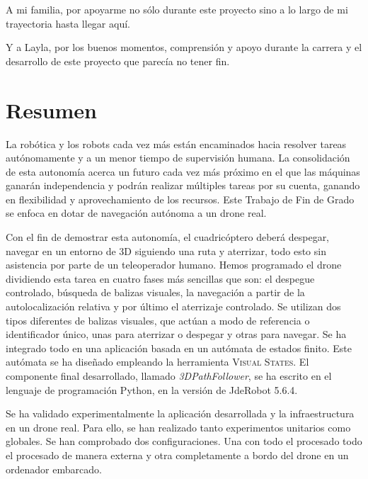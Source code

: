 \documentclass[a4paper, 12pt, oneside]{book}
\begin{document}
A mi familia, por apoyarme no sólo durante este proyecto sino a lo largo de mi trayectoria hasta llegar aquí.

Y a Layla, por los buenos momentos, comprensión y apoyo durante la carrera y el desarrollo de este proyecto que parecía no tener fin.

\chapter*{Resumen}
La robótica y los robots cada vez más están encaminados hacia resolver tareas autónomamente y a un menor tiempo de supervisión humana. La consolidación de esta autonomía acerca un futuro cada vez más próximo en el que las máquinas ganarán independencia y podrán realizar múltiples tareas por su cuenta, ganando en flexibilidad y aprovechamiento de los recursos. Este Trabajo de Fin de Grado se enfoca en dotar de navegación autónoma a un drone real.
 
Con el fin de demostrar esta autonomía, el cuadricóptero deberá despegar, navegar en un entorno de 3D siguiendo una ruta y aterrizar, todo esto sin asistencia por parte de un teleoperador humano. Hemos programado el drone dividiendo esta tarea en cuatro fases más sencillas que son: el despegue controlado, búsqueda de balizas visuales, la navegación a partir de la autolocalización relativa y por último el aterrizaje controlado. Se utilizan dos tipos diferentes de balizas visuales, que actúan a modo de referencia o identificador único, unas para aterrizar o despegar y otras para navegar. Se ha integrado todo en una aplicación basada en un autómata de estados finito. Este autómata se ha diseñado empleando la herramienta \textsc{Visual States}. El componente final desarrollado, llamado \textit{3DPathFollower}, se ha escrito en el lenguaje de programación Python, en la versión de JdeRobot 5.6.4. 

Se ha validado experimentalmente la aplicación desarrollada y la infraestructura en un drone real. Para ello, se han realizado tanto experimentos unitarios como globales. Se han comprobado dos configuraciones. Una con todo el procesado todo el procesado de manera externa y otra completamente a bordo del drone en un ordenador embarcado.



\renewcommand{\tablename}{Tabla}
\tableofcontents %

\listoffigures %
\cleardoublepage
\end{document}

